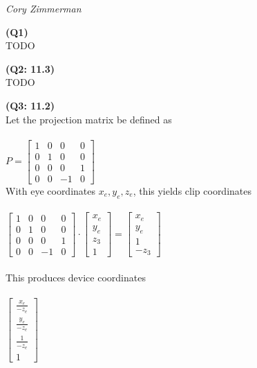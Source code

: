 \documentclass[letterpaper, 11pt]{article}
\begin{document}
\noindent \textit{Cory Zimmerman}
\medskip

\noindent \textbf{(Q1)} \\ 
TODO

\medskip
\noindent \textbf{(Q2: 11.3)} \\ 
TODO

\medskip
\noindent \textbf{(Q3: 11.2)} \\ 
Let the projection matrix be defined as \\ \\ 
$P = \begin{bmatrix}
1 & 0 & 0 & 0 \\
0 & 1 & 0 & 0 \\
0 & 0 & 0 & 1 \\
0 & 0 & -1 & 0
\end{bmatrix}$ \\

\noindent With eye coordinates $x_e, y_e, z_e$, this yields clip coordinates \\ \\ 
$\begin{bmatrix}
1 & 0 & 0 & 0 \\
0 & 1 & 0 & 0 \\
0 & 0 & 0 & 1 \\
0 & 0 & -1 & 0
\end{bmatrix} 
\cdot 
\begin{bmatrix}
x_e  \\
y_e  \\
z_3  \\
1 
\end{bmatrix}
=
\begin{bmatrix}
x_e  \\
y_e  \\
1 \\
-z_3
\end{bmatrix}$ \\ \\ 

\noindent This produces device coordinates \\ \\ 
$\begin{bmatrix}
\frac{x_e}{-z_e}  \\
\frac{y_e}{-z_e}  \\
\frac{1}{-z_e} \\
1
\end{bmatrix}$ \\ \\ 
\end{document}

